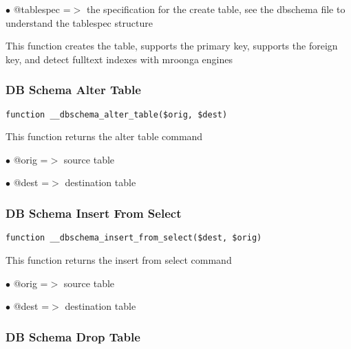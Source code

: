 \documentclass[a4paper]{article}
\begin{document}
\begin{compactitem}
\item[\color{myblue}$\bullet$] @tablespec =$>$ the specification for the create table, see the dbschema
              file to understand the tablespec structure
\end{compactitem}

This function creates the table, supports the primary key, supports the
foreign key, and detect fulltext indexes with mroonga engines

\hypertarget{toc430}{}
\subsubsection{DB Schema Alter Table}

\begin{lstlisting}
function __dbschema_alter_table($orig, $dest)
\end{lstlisting}

This function returns the alter table command

\begin{compactitem}
\item[\color{myblue}$\bullet$] @orig =$>$ source table
\item[\color{myblue}$\bullet$] @dest =$>$ destination table
\end{compactitem}

\hypertarget{toc431}{}
\subsubsection{DB Schema Insert From Select}

\begin{lstlisting}
function __dbschema_insert_from_select($dest, $orig)
\end{lstlisting}

This function returns the insert from select command

\begin{compactitem}
\item[\color{myblue}$\bullet$] @orig =$>$ source table
\item[\color{myblue}$\bullet$] @dest =$>$ destination table
\end{compactitem}

\hypertarget{toc432}{}
\subsubsection{DB Schema Drop Table}
\end{document}
